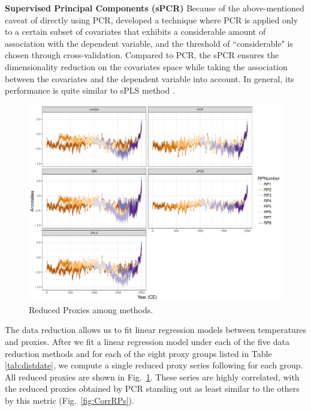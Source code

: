 \documentclass[12pt]{amsart}
\theoremstyle{plain}
\theoremstyle{definition}
\theoremstyle{remark}
\begin{document}
{\bf Supervised Principal Components (sPCR)}
Because of the above-mentioned caveat of directly using PCR, \cite{Bair2006} developed a technique where PCR is applied only
to a certain subset of covariates that exhibits a considerable amount of association
 with the dependent variable, and the threshold of ``considerable" is chosen through
cross-validation. Compared to PCR, the sPCR ensures the dimensionality
reduction on the covariates space while taking the association between
the covariates and the dependent variable into account. In general, its performance is quite similar to
sPLS method \citep{Chung2013}.  

\begin{figure}[h!]
  \centering
 \includegraphics[scale=0.40]{RPs_type} 
  \caption{Reduced Proxies among methods.}
  \label{fig:RPs}
\end{figure}

The data reduction allows us to fit linear regression models between
temperatures and proxies. After we fit a linear regression model under each of
the five data reduction methods and for each of the eight proxy groups listed in
Table \ref{tab:distdate}, we compute a single reduced proxy series following
\cite{Barboza2014} for each group. All reduced proxies are shown in Fig.~\ref{fig:RPs}.  These series are highly correlated, with the reduced proxies obtained by PCR standing out as least similar to the others by this metric (Fig.~\ref{fig:CorrRPs}).
\end{document}
